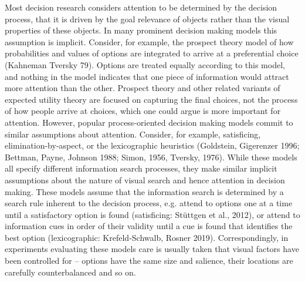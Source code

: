 \documentclass{article}
\begin{document}
Most decision research considers attention to be determined by the decision process, that it is driven by the goal relevance of objects rather than the visual properties of these objects. In many prominent decision making models this assumption is implicit. Consider, for example, the prospect theory model of how probabilities and values of options are integrated  to arrive at a preferential choice (Kahneman Tversky 79). Options are treated equally according to this model, and nothing in the model indicates that one piece of information would attract more attention than the other. Prospect theory and other related variants of expected utility theory are focused on capturing the final choices, not the process of how people arrive at choices, which one could argue is more important for attention. However, popular process-oriented decision making models commit to similar assumptions about attention. Consider, for example, satisficing, elimination-by-aspect, or the lexicographic heuristics (Goldstein, Gigerenzer 1996; Bettman, Payne, Johnson 1988; Simon, 1956, Tversky, 1976). While these models all specify different information search processes, they make similar implicit assumptions about the nature of visual search and hence attention in decision making. These  models assume that the information search is determined by a search rule inherent to the decision process, e.g. attend to options one at a time until a satisfactory option is found (satisficing: Stüttgen et al., 2012), or attend to information cues in order of their validity until a cue is found that identifies the best option (lexicographic: Krefeld-Schwalb, Rosner 2019). Correspondingly, in experiments evaluating these models care is usually taken that visual factors have been controlled for – options have the same size and salience, their locations are carefully counterbalanced and so on. 
\end{document}
